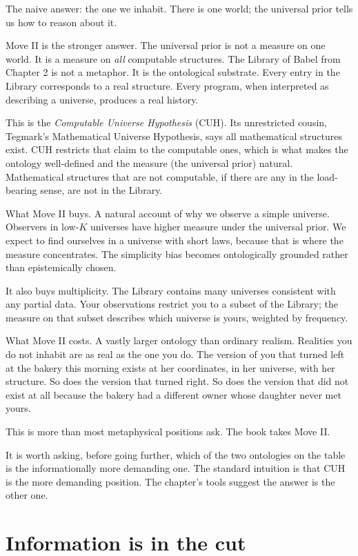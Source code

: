 The naive answer: the one we inhabit. There is one world; the universal prior tells us how to reason about it.

Move II is the stronger answer. The universal prior is not a measure on one world. It is a measure on \emph{all} computable structures. The Library of Babel from Chapter 2 is not a metaphor. It is the ontological substrate. Every entry in the Library corresponds to a real structure. Every program, when interpreted as describing a universe, produces a real history.

This is the \emph{Computable Universe Hypothesis} (CUH). Its unrestricted cousin, Tegmark's Mathematical Universe Hypothesis, says all mathematical structures exist. CUH restricts that claim to the computable ones, which is what makes the ontology well-defined and the measure (the universal prior) natural. Mathematical structures that are not computable, if there are any in the load-bearing sense, are not in the Library.

What Move II buys. A natural account of why we observe a simple universe. Observers in low-$K$ universes have higher measure under the universal prior. We expect to find ourselves in a universe with short laws, because that is where the measure concentrates. The simplicity bias becomes ontologically grounded rather than epistemically chosen.

It also buys multiplicity. The Library contains many universes consistent with any partial data. Your observations restrict you to a subset of the Library; the measure on that subset describes which universe is yours, weighted by frequency.

What Move II costs. A vastly larger ontology than ordinary realism. Realities you do not inhabit are as real as the one you do. The version of you that turned left at the bakery this morning exists at her coordinates, in her universe, with her structure. So does the version that turned right. So does the version that did not exist at all because the bakery had a different owner whose daughter never met yours.

This is more than most metaphysical positions ask. The book takes Move II.

It is worth asking, before going further, which of the two ontologies on the table is the informationally more demanding one. The standard intuition is that CUH is the more demanding position. The chapter's tools suggest the answer is the other one.

\section*{Information is in the cut}

